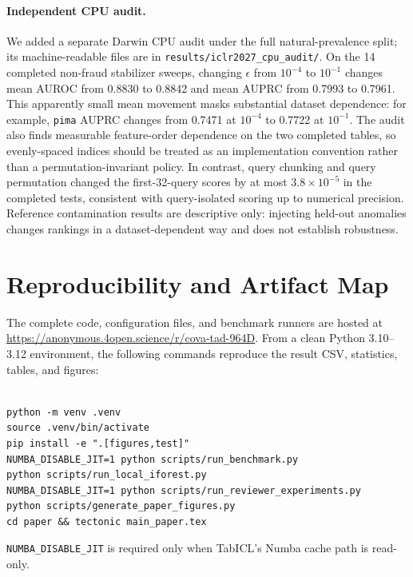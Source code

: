 \documentclass{article}
\begin{document}
\paragraph{Independent CPU audit.}
We added a separate Darwin CPU audit under the full natural-prevalence split; its machine-readable files are in \texttt{results/iclr2027\_cpu\_audit/}. On the 14 completed non-fraud stabilizer sweeps, changing $\epsilon$ from $10^{-4}$ to $10^{-1}$ changes mean AUROC from 0.8830 to 0.8842 and mean AUPRC from 0.7993 to 0.7961. This apparently small mean movement masks substantial dataset dependence: for example, \texttt{pima} AUPRC changes from 0.7471 at $10^{-4}$ to 0.7722 at $10^{-1}$. The audit also finds measurable feature-order dependence on the two completed tables, so evenly-spaced indices should be treated as an implementation convention rather than a permutation-invariant policy. In contrast, query chunking and query permutation changed the first-32-query scores by at most $3.8\times10^{-5}$ in the completed tests, consistent with query-isolated scoring up to numerical precision. Reference contamination results are descriptive only: injecting held-out anomalies changes rankings in a dataset-dependent way and does not establish robustness.

\section{Reproducibility and Artifact Map}
\label{app:reproducibility}

The complete code, configuration files, and benchmark runners are hosted at \url{https://anonymous.4open.science/r/cova-tad-964D}. From a clean Python 3.10--3.12 environment, the following commands reproduce the result CSV, statistics, tables, and figures:
\begin{verbatim}

python -m venv .venv
source .venv/bin/activate
pip install -e ".[figures,test]"
NUMBA_DISABLE_JIT=1 python scripts/run_benchmark.py
python scripts/run_local_iforest.py
NUMBA_DISABLE_JIT=1 python scripts/run_reviewer_experiments.py
python scripts/generate_paper_figures.py
cd paper && tectonic main_paper.tex
\end{verbatim}
\texttt{NUMBA\_DISABLE\_JIT} is required only when TabICL's Numba cache path is read-only.
\end{document}
